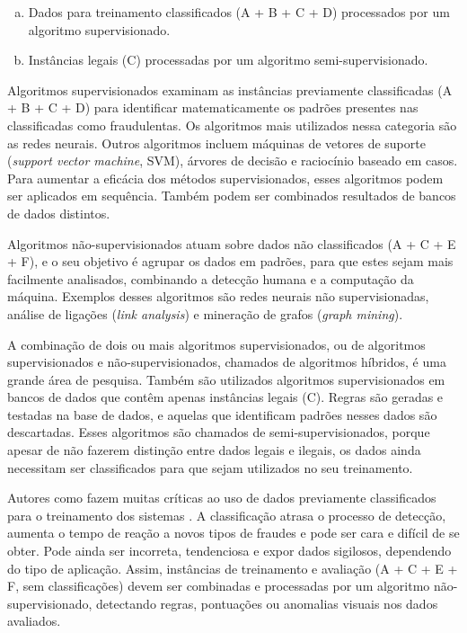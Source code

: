 \begin{enumerate}[a)]
\item Dados para treinamento classificados (A + B + C + D) processados por um algoritmo supervisionado.
\item Instâncias legais (C) processadas por um algoritmo semi-supervisionado.
\end{enumerate}

Algoritmos supervisionados examinam as instâncias previamente classificadas (A + B + C + D) para identificar matematicamente os padrões presentes nas classificadas como fraudulentas. Os algoritmos mais utilizados nessa categoria são as redes neurais. Outros algoritmos incluem máquinas de vetores de suporte (\emph{support vector machine}, SVM), árvores de decisão e raciocínio baseado em casos. Para aumentar a eficácia dos métodos supervisionados, esses algoritmos podem ser aplicados em sequência. Também podem ser combinados resultados de bancos de dados distintos.

Algoritmos não-supervisionados atuam sobre dados não classificados (A + C + E + F), e o seu objetivo é agrupar os dados em padrões, para que estes sejam mais facilmente analisados, combinando a detecção humana e a computação da máquina. Exemplos desses algoritmos são redes neurais não supervisionadas, análise de ligações (\emph{link analysis}) e mineração de grafos (\emph{graph mining}).

A combinação de dois ou mais algoritmos supervisionados, ou de algoritmos supervisionados e não-supervisionados, chamados de algoritmos híbridos, é uma grande área de pesquisa. Também são utilizados algoritmos supervisionados em bancos de dados que contêm apenas instâncias legais (C). Regras são geradas e testadas na base de dados, e aquelas que identificam padrões nesses dados são descartadas. Esses algoritmos são chamados de semi-supervisionados, porque apesar de não fazerem distinção entre dados legais e ilegais, os dados ainda necessitam ser classificados para que sejam utilizados no seu treinamento.

Autores como \citeauthor{Phua2010} fazem muitas críticas ao uso de dados previamente classificados para o treinamento dos sistemas \cite{Phua2010}. A classificação atrasa o processo de detecção, aumenta o tempo de reação a novos tipos de fraudes e pode ser cara e difícil de se obter. Pode ainda ser incorreta, tendenciosa e expor dados sigilosos, dependendo do tipo de aplicação. Assim, instâncias de treinamento e avaliação (A + C + E + F, sem classificações) devem ser combinadas e processadas por um algoritmo não-supervisionado, detectando regras, pontuações ou anomalias visuais nos dados avaliados.

